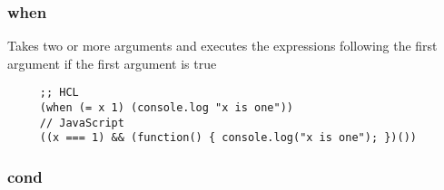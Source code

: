 \documentclass[11pt]{article}
\begin{document}
\subsubsection{when}
\label{sec-1.3.8}

    Takes two or more arguments and executes the expressions following
    the first argument if the first argument is true
    
\begin{verbatim}
     ;; HCL
     (when (= x 1) (console.log "x is one"))
     // JavaScript
     ((x === 1) && (function() { console.log("x is one"); })())
\end{verbatim}


\subsubsection{cond}
\label{sec-1.3.9}

    
\end{document}
